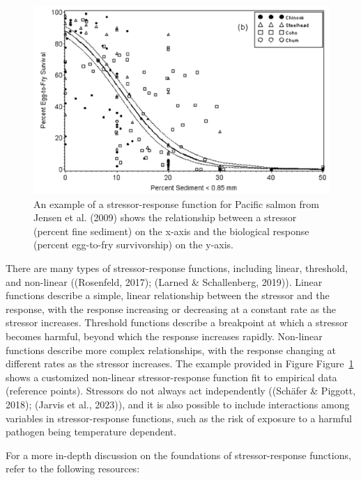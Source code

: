 \documentclass[
  letterpaper,
  DIV=11,
  numbers=noendperiod]{scrreprt}
\begin{document}
\begin{figure}

{\centering \includegraphics{images/image005.png}

}

\caption{\label{fig-1}An example of a stressor-response function for
Pacific salmon from Jensen et al. (2009) shows the relationship between
a stressor (percent fine sediment) on the x-axis and the biological
response (percent egg-to-fry survivorship) on the y-axis.}

\end{figure}

There are many types of stressor-response functions, including linear,
threshold, and non-linear ((Rosenfeld, 2017); (Larned \& Schallenberg,
2019)). Linear functions describe a simple, linear relationship between
the stressor and the response, with the response increasing or
decreasing at a constant rate as the stressor increases. Threshold
functions describe a breakpoint at which a stressor becomes harmful,
beyond which the response increases rapidly. Non-linear functions
describe more complex relationships, with the response changing at
different rates as the stressor increases. The example provided in
Figure Figure~\ref{fig-1} shows a customized non-linear
stressor-response function fit to empirical data (reference points).
Stressors do not always act independently ((Schäfer \& Piggott, 2018);
(Jarvis et al., 2023)), and it is also possible to include interactions
among variables in stressor-response functions, such as the risk of
exposure to a harmful pathogen being temperature dependent.

For a more in-depth discussion on the foundations of stressor-response
functions, refer to the following resources:
\end{document}
